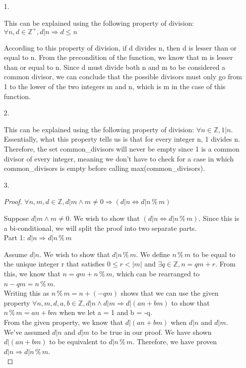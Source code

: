 \documentclass[11pt]{article}
\begin{document}
\begin{enumerate}
\item[1.]

This can be explained using the following property of division: $\forall n, d\in \mathbb{Z}^{+}, d|n \Rightarrow d \le n$

According to this property of division, if d divides n, then d is lesser than or equal to n. From the precondition of the function, we know that m is lesser than or equal to n. Since d must divide both n and m to be considered a common divisor, we can conclude that the possible divisors must only go from 1 to the lower of the two integers m and n, which is m in the case of this function. 

\item[2.]

This can be explained using the following property of division: $\forall n\in \mathbb{Z}, 1|n$. Essentially, what this property tells us is that for every integer n, 1 divides n. Therefore, the set common\_divisors will never be empty since 1 is a common divisor of every integer, meaning we don't have to check for a case in which common\_divisors is empty before calling max(common\_divisors). 

\item[3.]

\begin{proof}
$\forall n, m, d\in \mathbb{Z}, d|m \land m \ne 0 \Rightarrow (d|n \iff d|n \mathbin{\%} m)$

Suppose $d|m \land m \ne 0$. We wish to show that $(d|n \iff d|n \mathbin{\%} m)$. Since this is a bi-conditional, we will split the proof into two separate parts. \\

Part 1: $d|n \Rightarrow d|n \mathbin{\%} m$

Assume $d|n$. We wish to show that $d|n \mathbin{\%} m$. We define $n \mathbin{\%} m$ to be equal to the unique integer r that satisfies $0 \le r < |m|$ and $\exists q\in \mathbb{Z}, n = qm + r$. From this, we know that $n = qm + n \mathbin{\%} m$, which can be rearranged to $n - qm = n \mathbin{\%} m$.\\

Writing this as $n \mathbin{\%} m = n + (-qm)$ shows that we can use the given property $\forall n, m, d, a, b\in \mathbb{Z}, d|n \land d|m \Rightarrow d|(an+bm)$ to show that $n \mathbin{\%} m = an + bm$ when we let a = 1 and b = -q.\\

From the given property, we know that $d|(an+bm)$ when $d|n$ and $d|m$. We've assumed $d|n$ and $d|m$ to be true in our proof. We have shown $d|(an+bm)$ to be equivalent to $d|n \mathbin{\%} m$. Therefore, we have proven $d|n \Rightarrow d|n \mathbin{\%} m$. \\ 


\end{proof}
\end{enumerate}
\end{document}
